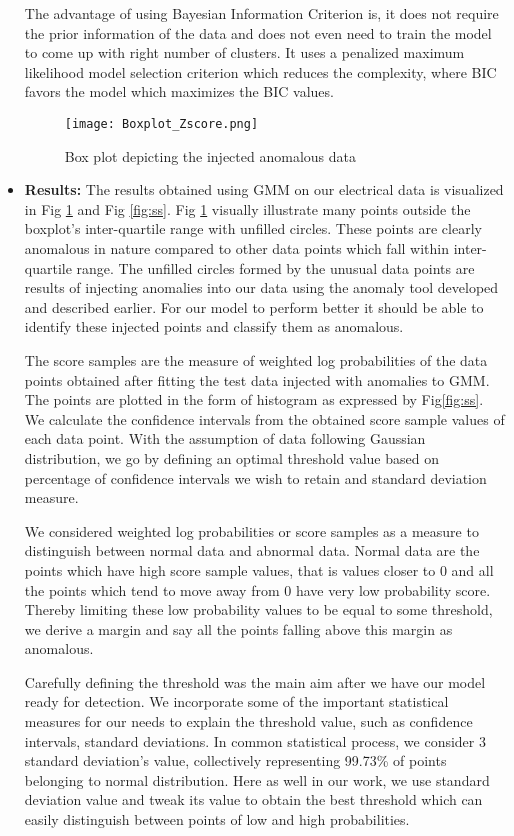 \begin{itemize}
The advantage of using Bayesian Information Criterion is, it does not require the prior information of the data and does not even need to train the model to come up with right number of clusters. It uses a penalized maximum likelihood model selection criterion which reduces the complexity, where BIC favors the model which maximizes the BIC values.

\begin{figure}
\centerline{\texttt{[image: Boxplot\_Zscore.png]}}
    \caption{Box plot depicting the injected anomalous data}
    \label{fig:bic_zs}
\end{figure}
\item\textbf{Results:} The results obtained using GMM on our electrical data is visualized in Fig \ref{fig:bic_zs} and Fig \ref{fig:ss}. Fig \ref{fig:bic_zs} visually illustrate many points outside the boxplot's inter-quartile range with unfilled circles. These points are clearly anomalous in nature compared to other data points which fall within inter-quartile range. The unfilled circles formed by the unusual data points are results of injecting anomalies into our data using the anomaly tool developed and described earlier. For our model to perform better it should be able to identify these injected points and classify them as anomalous. 

The score samples are the measure of weighted log probabilities of the data points obtained after fitting the test data injected with anomalies to GMM. The points are plotted in the form of histogram as expressed by Fig\ref{fig:ss}. We calculate the confidence intervals from the obtained score sample values of each data point. With the assumption of data following Gaussian distribution, we go by defining an optimal threshold value based on percentage of confidence intervals we wish to retain and standard deviation measure.

We considered weighted log probabilities or score samples as a measure to distinguish between normal data and abnormal data. Normal data are the points which have high score sample values, that is values closer to 0 and all the points which tend to move away from 0 have very low probability score. Thereby limiting these low probability values to be equal to some threshold, we derive a margin and say all the points falling above this margin as anomalous. 

Carefully defining the threshold was the main aim after we have our model ready for detection. We incorporate some of the important statistical measures for our needs to explain the threshold value, such as confidence intervals, standard deviations. In common statistical process, we consider 3 standard deviation's value, collectively representing 99.73\% of points belonging to normal distribution. Here as well in our work, we use standard deviation value and tweak its value to obtain the best threshold which can easily distinguish between points of low and high probabilities.


\end{itemize}
